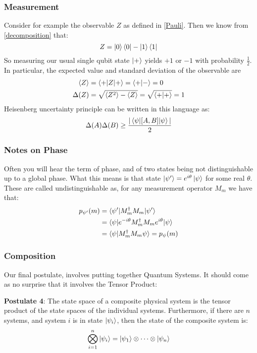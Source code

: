 \documentclass{beamer}
\begin{document}
    \begin{frame}
        \frametitle{Measurement}
        \begin{example}
            Consider for example the observable $Z$ as defined in \ref{Pauli}. 
            Then we know from \ref{decomposition} that:
            \begin{equation}
                Z = \ket{0}\bra{0} - \ket{1}\bra{1}
            \end{equation}
            So measuring our usual single qubit state $\ket{+}$ yields $+1$ or $-1$ with
            probability $\frac{1}{2}$. In particular, the expected value and standard deviation of the observable
            are
            \begin{align}
             \braket{Z} &= \braket{+|Z|+} = \braket{+| -} = 0 \\
             \Delta(Z) &= \sqrt{\braket{Z^2} - \braket{Z}} = \sqrt{\braket{+|+}} = 1
            \end{align}
            Heisenberg uncertainty principle can be written in this language as:
            \begin{equation}
                \Delta(A)\Delta(B) \geq \frac{|\braket{\psi|[A, B]|\psi}|}{2}
            \end{equation}
        \end{example}
    \end{frame}
    \begin{frame}
        \frametitle{Notes on Phase}
        Often you will hear the term of phase, and of two states being not distinguishable
        up to a global phase. What this means is that state $\ket{\psi'} = e^{i\theta}\ket{\psi}$
        for some real $\theta$. These are called undistinguishable as, for any measurement
        operator $M_m$ we have that:
        \begin{align}
            p_{\psi'}(m) &= \braket{\psi'|M_m^\dagger M_m|\psi'} \\ 
            &= \braket{\psi|e^{-i\theta}M_m^\dagger M_m e^{i\theta} |\psi} \\
            &= \braket{\psi|M_m^\dagger M_m \psi} = p_{\psi}(m)
        \end{align}
    \end{frame}
    \begin{frame}
        \frametitle{Composition}
        Our final postulate, involves putting together Quantum Systems. 
        It should come as no surprise that it involves the Tensor Product:
        \begin{definition}
            \textbf{Postulate 4}: The state space of a composite physical system is the tensor 
            product of the state spaces of the individual systems. Furthermore,
            if there are $n$ systems, and system $i$ is in state $\ket{\psi_i}$,
            then the state of the composite system is:
            \begin{equation}
                \bigotimes_{i=1}^n \ket{\psi_i} = \ket{\psi_1} \otimes\dots \otimes \ket{\psi_n}
            \end{equation}
        \end{definition}
    \end{frame}
\end{document}
